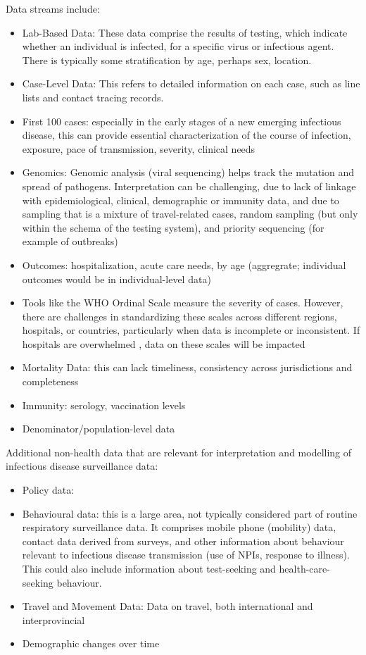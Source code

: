 Data streams include:
\begin{itemize}
\item Lab-Based Data: These data comprise the results of testing, which indicate whether an individual is infected, for a specific virus or infectious agent. There is typically some stratification by age, perhaps sex, location. 
\item Case-Level Data: This refers to detailed information on each case, such as line lists and contact tracing records.
\item First 100 cases: especially in the early stages of a new emerging infectious disease, this can provide essential characterization of the course of infection, exposure, pace of transmission, severity, clinical needs
\item Genomics: Genomic analysis (viral sequencing) helps track the mutation and spread of pathogens. Interpretation can be challenging, due to lack of linkage with epidemiological, clinical, demographic or immunity data, and due to sampling that is a mixture of travel-related cases, random sampling (but only within the schema of the testing system), and priority sequencing (for example of outbreaks)
\item Outcomes: hospitalization, acute care needs, by age (aggregrate; individual outcomes would be in individual-level data) 
\item Tools like the WHO Ordinal Scale measure the severity of cases. However, there are challenges in standardizing these scales across different regions, hospitals, or countries, particularly when data is incomplete or inconsistent. If hospitals are overwhelmed , data on these scales will be impacted 
\item Mortality Data: this can lack timeliness, consistency across jurisdictions and completeness
\item Immunity: serology, vaccination levels
\item Denominator/population-level data
\end{itemize}


Additional non-health data that are relevant for interpretation and modelling of infectious disease surveillance data: 
\begin{itemize}
\item  Policy data: 
\item Behavioural data: this is a large area, not typically considered part of routine respiratory surveillance data. It comprises mobile phone  (mobility) data, contact data derived from surveys, and other information about behaviour relevant to infectious disease transmission (use of NPIs, response to illness). This could also include information about test-seeking and health-care-seeking behaviour. 
\item Travel and Movement Data: Data on travel, both international and interprovincial
\item Demographic changes over time
\end{itemize}

